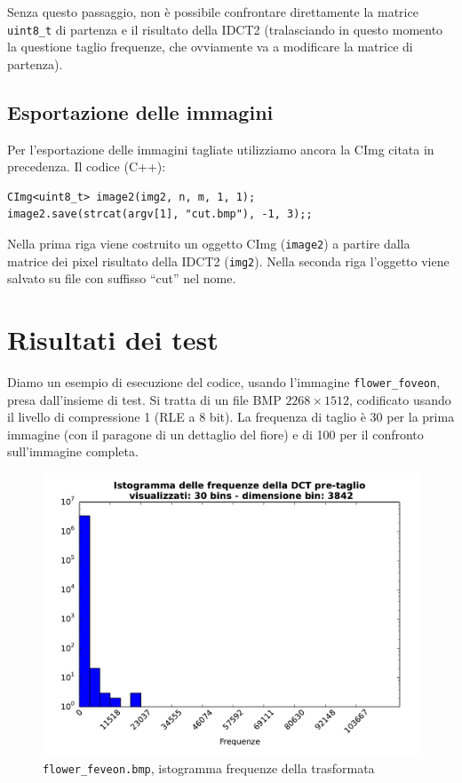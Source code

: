 \documentclass[11pt,a4paper]{scrartcl}
\begin{document}
Senza questo passaggio, non è possibile confrontare direttamente la matrice \texttt{uint8\_t} di partenza e il risultato della IDCT2 (tralasciando in questo momento la questione taglio frequenze, che ovviamente va a modificare la matrice di partenza).

\subsection*{Esportazione delle immagini}
Per l'esportazione delle immagini tagliate utilizziamo ancora la CImg citata in precedenza. Il codice (C++):
\begin{verbatim}
CImg<uint8_t> image2(img2, n, m, 1, 1);
image2.save(strcat(argv[1], "cut.bmp"), -1, 3);;
\end{verbatim}

Nella prima riga viene costruito un oggetto CImg (\texttt{image2}) a partire dalla matrice dei pixel risultato della IDCT2 (\texttt{img2}). Nella seconda riga l'oggetto viene salvato su file con suffisso ``cut'' nel nome.

\section*{Risultati dei test}

Diamo un esempio di esecuzione del codice, usando l'immagine \texttt{flower\_foveon}, presa dall'insieme di test. Si tratta di un file BMP $2268 \times 1512$, codificato usando il livello di compressione 1 (RLE a 8 bit). La frequenza di taglio è 30 per la prima immagine (con il paragone di un dettaglio del fiore) e di 100 per il confronto sull'immagine completa.

\begin{figure}[!ht]
\centering
\includegraphics[scale=0.6]{images/hist_fiore_30_pre} 
\caption{\texttt{flower\_feveon.bmp}, istogramma frequenze della trasformata}
\end{figure}
\end{document}
